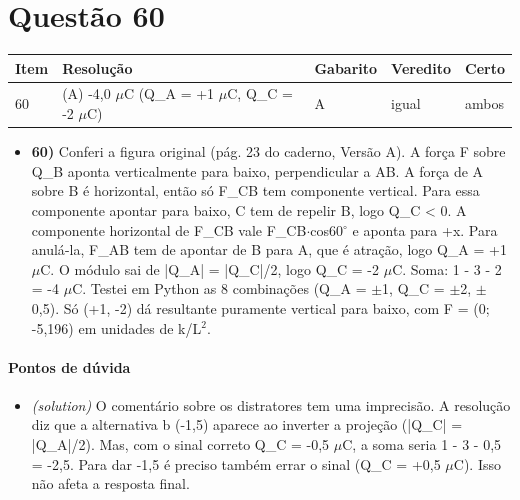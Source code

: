 \documentclass{article}%
\begin{document}
\section*{Questão 60}%
\begin{longtable}{@{}p{} p{} p{} p{} p{}@{}}\toprule Item & Resolução & Gabarito & Veredito & Certo \\ \midrule
60 & (A) -4,0 $\mu$C  (Q\_A = +1 $\mu$C, Q\_C = -2 $\mu$C) & A & igual & ambos \\
\bottomrule\end{longtable}%
\begin{itemize}%
\item%
\textbf{60)} Conferi a figura original (pág. 23 do caderno, Versão A). A força F sobre Q\_B aponta verticalmente para baixo, perpendicular a AB. A força de A sobre B é horizontal, então só F\_CB tem componente vertical. Para essa componente apontar para baixo, C tem de repelir B, logo Q\_C < 0. A componente horizontal de F\_CB vale F\_CB$\cdot$cos60$^\circ$ e aponta para +x. Para anulá{-}la, F\_AB tem de apontar de B para A, que é atração, logo Q\_A = +1 $\mu$C. O módulo sai de |Q\_A| = |Q\_C|/2, logo Q\_C = -2 $\mu$C. Soma: 1 - 3 - 2 = -4 $\mu$C. Testei em Python as 8 combinações (Q\_A = $\pm$1, Q\_C = $\pm$2, $\pm$0,5). Só (+1, -2) dá resultante puramente vertical para baixo, com F = (0; -5,196) em unidades de k/L$^2$.%
\end{itemize}%
\paragraph{Pontos de dúvida}%
\begin{itemize}%
\item%
\textit{(solution)} O comentário sobre os distratores tem uma imprecisão. A resolução diz que a alternativa b (-1,5) aparece ao inverter a projeção (|Q\_C| = |Q\_A|/2). Mas, com o sinal correto Q\_C = -0,5 $\mu$C, a soma seria 1 - 3 - 0,5 = -2,5. Para dar -1,5 é preciso também errar o sinal (Q\_C = +0,5 $\mu$C). Isso não afeta a resposta final.%
\end{itemize}%
\end{document}
